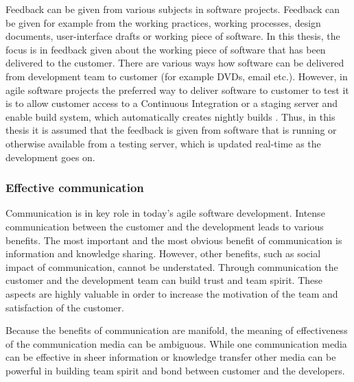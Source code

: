 \documentclass[english,12pt,a4paper,pdftex]{article}
\begin{document}
Feedback can be given from various subjects in software projects. Feedback can be given for example from the working practices, working processes, design documents, user-interface drafts or working piece of software. In this thesis, the focus is in feedback given about the working piece of software that has been delivered to the customer. There are various ways how software can be delivered from development team to customer (for example DVDs, email etc.). However, in agile software projects the preferred way to deliver software to customer to test it is to allow customer access to a Continuous Integration or a staging server and enable build system, which automatically creates nightly builds \citep{shore2007} \citep{beck2004}. Thus, in this thesis it is assumed that the feedback is given from software that is running or otherwise available from a testing server, which is updated real-time as the development goes on.

\subsubsection{Effective communication}

Communication is in key role in today's agile software development. Intense communication between the customer and the development leads to various benefits. The most important and the most obvious benefit of communication is information and knowledge sharing. However, other benefits, such as social impact of communication, cannot be understated. Through communication the customer and the development team can build trust and team spirit. These aspects are highly valuable in order to increase the motivation of the team and satisfaction of the customer.

Because the benefits of communication are manifold, the meaning of effectiveness of the communication media can be ambiguous. While one communication media can be effective in sheer information or knowledge transfer other media can be powerful in building team spirit and bond between customer and the developers.
\end{document}
